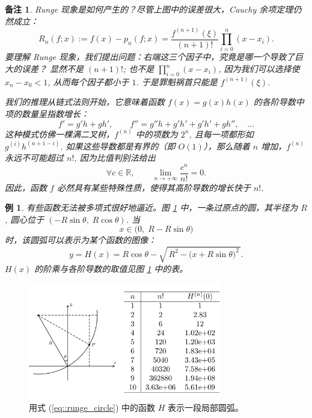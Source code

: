 \documentclass[a4paper]{ctexart}
\newtheorem{remark}{备注}
\newtheorem{example}[theorem]{例}
\numberwithin{theorem}{section}
\numberwithin{equation}{section}
\numberwithin{figure}{section}
\numberwithin{remark}{section}
\begin{document}
\begin{remark}
Runge 现象是如何产生的？尽管上图中的误差很大，Cauchy 余项定理仍然成立：
\begin{equation*}
R_n(f;x):=f(x)-p_n(f;x)=\frac{f^{(n+1)}(\xi)}{(n+1)!}\prod_{i=0}^{n}(x-x_i).
\end{equation*}
要理解 Runge 现象，我们提出问题：右端这三个因子中，究竟是哪一个导致了巨大的误差？
显然不是 $(n+1)!$; 也不是 $\prod_{i=0}^{n}(x-x_i)$, 因为我们可以选择使 $x_n-x_0<1$, 
从而每个因子都小于 $1$. 于是罪魁祸首只能是 $f^{(n+1)}(\xi)$.

我们的推理从链式法则开始，它意味着函数 $f(x)=g(x)h(x)$ 的各阶导数中项的数量呈指数增长：
\begin{equation*}
f'=g'h+gh',\qquad
f''=g''h+g'h'+g'h'+gh'',\quad \ldots
\end{equation*}
这种模式仿佛一棵满二叉树，$f^{(n)}$ 中的项数为 $2^{n}$, 且每一项都形如 $g^{(i)}h^{(n+1-i)}$. 
如果这些导数都是有界的（即 $O(1)$），那么随着 $n$ 增加，$f^{(n)}$ 永远不可能超过 $n!$, 因为比值判别法给出
\begin{equation*}
\forall c\in\mathbb{R},\qquad \lim_{n\to+\infty}\frac{c^{n}}{n!}=0.
\end{equation*}
因此，函数 $f$ 必然具有某些特殊性质，使得其高阶导数的增长快于 $n!$.
\end{remark}

\begin{example}
    \label{exp::runge_circle}
有些函数无法被多项式很好地逼近。图 \ref{fig::runge_circle} 中，一条过原点的圆，其半径为 $R$, 圆心位于 $(-R\sin\theta,\; R\cos\theta)$. 当
\begin{equation*}
x\in\bigl(0,\; R-R\sin\theta\bigr)
\end{equation*}
时，该圆弧可以表示为某个函数的图像：
\begin{equation}
    \label{eq::runge_circle}
y=H(x)=R\cos\theta-\sqrt{\,R^{2}-\bigl(x+R\sin\theta\bigr)^{2}\,}.
\end{equation}
$H(x)$ 的阶乘与各阶导数的取值见图 \ref{fig::runge_circle} 中的表。
\end{example}

\begin{figure}
    \centering
    \includegraphics[width=0.75\textwidth]{images/runge_circle.png}
    \caption{用式 (\ref{eq::runge_circle}) 中的函数 $H$ 表示一段局部圆弧。}
    \label{fig::runge_circle}
\end{figure}
\end{document}
